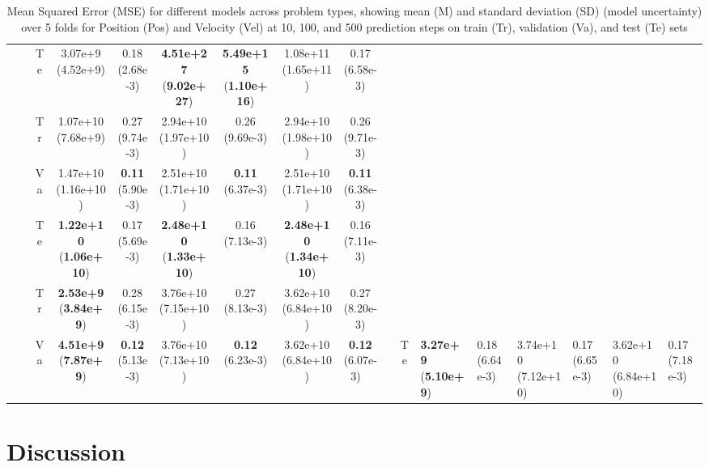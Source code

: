 \documentclass[11pt,a4paper, twocolumn]{article}
\begin{document}
\begin{table}[htbp]
\begin{tabular}{@{}llccccccccc@{}}
  & & Te & 3.07e+9 (4.52e+9) & 0.18 (2.68e-3) & \textbf{4.51e+27} (\textbf{9.02e+27}) & \textbf{5.49e+15} (\textbf{1.10e+16}) & 1.08e+11 (1.65e+11) & 0.17 (6.58e-3) \\
  \cmidrule(lr){2-9}
  & 
  & Tr & 1.07e+10 (7.68e+9) & 0.27 (9.74e-3) & 2.94e+10 (1.97e+10) & 0.26 (9.69e-3) & 2.94e+10 (1.98e+10) & 0.26 (9.71e-3) \\
  & & Va & 1.47e+10 (1.16e+10) & \textbf{0.11} (5.90e-3) & 2.51e+10 (1.71e+10) & \textbf{0.11} (6.37e-3) & 2.51e+10 (1.71e+10) & \textbf{0.11} (6.38e-3) \\
  & & Te & \textbf{1.22e+10} (\textbf{1.06e+10}) & 0.17 (5.69e-3) & \textbf{2.48e+10} (\textbf{1.33e+10}) & 0.16 (7.13e-3) & \textbf{2.48e+10} (\textbf{1.34e+10}) & 0.16 (7.11e-3) \\
  \cmidrule(lr){2-9}
  & 
  & Tr & \textbf{2.53e+9} (\textbf{3.84e+9}) & 0.28 (6.15e-3) & 3.76e+10 (7.15e+10) & 0.27 (8.13e-3) & 3.62e+10 (6.84e+10) & 0.27 (8.20e-3) \\
  & & Va & \textbf{4.51e+9} (\textbf{7.87e+9}) & \textbf{0.12} (5.13e-3) & 3.76e+10 (7.13e+10) & \textbf{0.12} (6.23e-3) & 3.62e+10 (6.84e+10) & \textbf{0.12} (6.07e-3) \
  & & Te & \textbf{3.27e+9} (\textbf{5.10e+9}) & 0.18 (6.64e-3) & 3.74e+10 (7.12e+10) & 0.17 (6.65e-3) & 3.62e+10 (6.84e+10) & 0.17 (7.18e-3) \\
  \bottomrule
  \end{tabular}
  \caption{Mean Squared Error (MSE) for different models across problem types, showing mean (M) and standard deviation (SD) (model uncertainty) over 5 folds for Position (Pos) and Velocity (Vel) at 10, 100, and 500 prediction steps on train (Tr), validation (Va), and test (Te) sets}
  \label{tab:model_comprehensive_mse_compact}
  \end{table}
\twocolumn

\section{Discussion}
\end{document}
